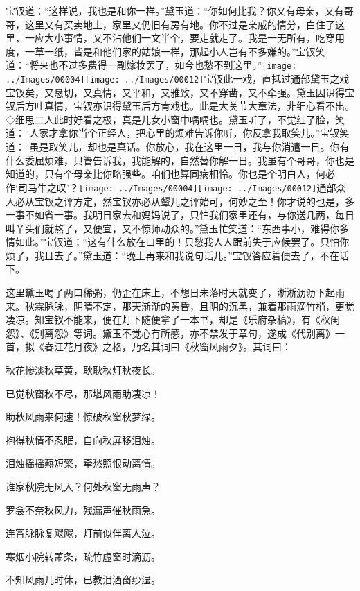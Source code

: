宝钗道：``这样说，我也是和你一样。''黛玉道：``你如何比我？你又有母亲，又有哥哥，这里又有买卖地土，家里又仍旧有房有地。你不过是亲戚的情分，白住了这里，一应大小事情，又不沾他们一文半个，要走就走了。我是一无所有，吃穿用度，一草一纸，皆是和他们家的姑娘一样，那起小人岂有不多嫌的。''宝钗笑道：``将来也不过多费得一副嫁妆罢了，如今也愁不到这里。''{\texttt{[image: ../Images/00004]}\texttt{[image: ../Images/00012]}\footnotesize \kaishu 宝钗此一戏，直抵过通部黛玉之戏宝钗矣，又恳切，又真情，又平和，又雅致，又不穿凿，又不牵强。黛玉因识得宝钗后方吐真情，宝钗亦识得黛玉后方肯戏也。此是大关节大章法，非细心看不出。◇细思二人此时好看之极，真是儿女小窗中喁喁也。}黛玉听了，不觉红了脸，笑道：``人家才拿你当个正经人，把心里的烦难告诉你听，你反拿我取笑儿。''宝钗笑道：``虽是取笑儿，却也是真话。你放心，我在这里一日，我与你消遣一日。你有什么委屈烦难，只管告诉我，我能解的，自然替你解一日。我虽有个哥哥，你也是知道的，只有个母亲比你略强些。咱们也算同病相怜。你也是个明白人，何必作`司马牛之叹'？{\texttt{[image: ../Images/00004]}\texttt{[image: ../Images/00012]}\footnotesize \kaishu 通部众人必从宝钗之评方定，然宝钗亦必从颦儿之评始可，何妙之至！}你才说的也是，多一事不如省一事。我明日家去和妈妈说了，只怕我们家里还有，与你送几两，每日叫丫头们就熬了，又便宜，又不惊师动众的。''黛玉忙笑道：``东西事小，难得你多情如此。''宝钗道：``这有什么放在口里的！只愁我人人跟前失于应候罢了。只怕你烦了，我且去了。''黛玉道：``晚上再来和我说句话儿。''宝钗答应着便去了，不在话下。

这里黛玉喝了两口稀粥，仍歪在床上，不想日未落时天就变了，淅淅沥沥下起雨来。秋霖脉脉，阴晴不定，那天渐渐的黄昏，且阴的沉黑，兼着那雨滴竹梢，更觉凄凉。知宝钗不能来，便在灯下随便拿了一本书，却是《乐府杂稿》，有《秋闺怨》、《别离怨》等词。黛玉不觉心有所感，亦不禁发于章句，遂成《代别离》一首，拟《春江花月夜》之格，乃名其词曰《秋窗风雨夕》。其词曰：

秋花惨淡秋草黄，耿耿秋灯秋夜长。

已觉秋窗秋不尽，那堪风雨助凄凉！

助秋风雨来何速！惊破秋窗秋梦绿。

抱得秋情不忍眠，自向秋屏移泪烛。

泪烛摇摇爇短檠，牵愁照恨动离情。

谁家秋院无风入？何处秋窗无雨声？

罗衾不奈秋风力，残漏声催秋雨急。

连宵脉脉复飕飕，灯前似伴离人泣。

寒烟小院转萧条，疏竹虚窗时滴沥。

不知风雨几时休，已教泪洒窗纱湿。

